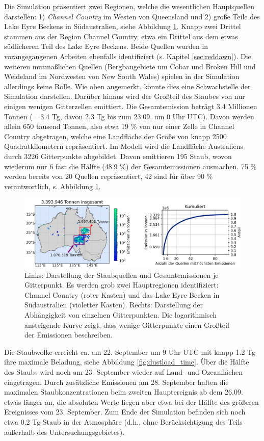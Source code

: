 \documentclass[12pt,a4paper,onecolumn]{scrartcl}
\begin{document}
Die Simulation präsentiert zwei Regionen, welche die wesentlichen Hauptquellen darstellen: 1) \textit{Channel Country} im Westen von Queensland und 2) große Teile des Lake Eyre Beckens in Südaustralien, siehe Abbildung \ref{fig:emissions}. Knapp zwei Drittel stammen aus der Region Channel Country, etwa ein Drittel aus dem etwas südlicheren Teil des Lake Eyre Beckens. Beide Quellen wurden in vorangegangenen Arbeiten ebenfalls identifiziert (s. Kapitel \ref{sec:reddawn}). Die weiteren mutmaßlichen Quellen (Bergbaugebiete um Cobar und Broken Hill und Weideland im Nordwesten von New South Wales) spielen in der Simulation allerdings  keine Rolle. Wie oben angemerkt, könnte dies eine Schwachstelle der Simulation darstellen. Darüber hinaus wird der Großteil des Staubes von nur einigen wenigen Gitterzellen emittiert. Die Gesamtemission beträgt 3.4 Millionen Tonnen (= 3.4 Tg, davon 2.3 Tg bis zum 23.09. um 0 Uhr UTC). Davon werden allein 650 tausend Tonnen, also etwa 19 \% von nur einer Zelle in Channel Country abgetragen, welche eine Landfläche der Größe von knapp 2500 Quadratkilometern repräsentiert. Im Modell wird die Landfläche Australiens durch 3226 Gitterpunkte abgebildet. Davon emittieren 195 Staub, wovon wiederum nur 6 fast die Hälfte (48.9 \%) der Gesamtemissionen ausmachen. 75 \% werden bereits von 20 Quellen repräsentiert, 42 sind für über 90 \% verantwortlich, s. Abbildung \ref{fig:emissions}. 
\begin{figure}[!htb]
\includegraphics[width=\textwidth]{bilder/emission_sections.png}
\caption{Links: Darstellung der Staubquellen und Gesamtemissionen je Gitterpunkt. Es werden grob zwei Hauptregionen identifiziert: Channel Country (roter Kasten) und das Lake Eyre Becken in Südaustralien (violetter Kasten). Rechts: Darstellung der Abhängigkeit von einzelnen Gitterpunkten. Die logarithmisch ansteigende Kurve zeigt, dass wenige Gitterpunkte einen Großteil der Emissionen beschreiben.} \label{fig:emissions}
\end{figure}
Die Staubwolke erreicht ca. am 22. September um 9 Uhr UTC mit knapp 1.2 Tg ihre maximale Beladung, siehe Abbildung \ref{fig:dustload_time}. Über die Hälfte des Staubs wird noch am 23. September wieder auf Land- und Ozeanflächen eingetragen. Durch zusätzliche Emissionen am 28. September halten die maximalen Staubkonzentrationen beim zweiten Hauptereignis ab dem 26.09. etwas länger an, die absoluten Werte liegen aber etwa bei der Hälfte des größeren Ereignisses vom 23. September. Zum Ende der Simulation befinden sich noch etwa 0.2 Tg Staub in der Atmosphäre (d.h., ohne Berücksichtigung des Teils außerhalb des Untersuchungsgebietes).
\end{document}
